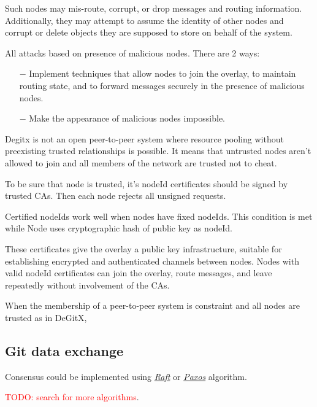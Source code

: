 \documentclass[acmlarge, screen, nonacm]{acmart}
\newcommand{\todo}[1]{\textcolor{red}{TODO: #1}}
\begin{document}
Such nodes may mis-route, corrupt, or drop messages and routing information.
Additionally, they may attempt to assume the identity of other nodes and corrupt or delete objects
they are supposed to store on behalf of the system.

All attacks based on presence of malicious nodes.
There are 2 ways:
\begin{itemize}
  \item[$-$] Implement techniques that allow nodes to join the overlay, to maintain routing state, and to forward messages securely in the presence of malicious nodes.
  \item[$-$] Make the appearance of malicious nodes impossible.
\end{itemize}

Degitx is not an open peer-to-peer system
where resource pooling without preexisting trusted relationships is possible.
It means that untrusted nodes aren't allowed to join
and all members of the network are trusted not to cheat.

To be sure that node is trusted, it's nodeId certificates should be signed by trusted CAs.
Then each node rejects all unsigned requests.

Certified nodeIds work well when nodes have fixed nodeIds.
This condition is met while Node uses cryptographic hash of public key as nodeId.

These certificates give the overlay a public key infrastructure,
suitable for establishing encrypted and authenticated channels between nodes.
Nodes with valid nodeId certificates can join the overlay, route messages,
and leave repeatedly without involvement of the CAs.

When the membership of a peer-to-peer system is constraint and all nodes are trusted as in DeGitX,

\subsection{Git data exchange}
\label{sec:data}
Consensus could be implemented using \emph{\href{https://raft.github.io/raft.pdf}{Raft}} or
\emph{\href{http://www.cs.yale.edu/homes/aspnes/pinewiki/Paxos.html}{Paxos}} algorithm.

\todo{search for more algorithms}.


\end{document}
